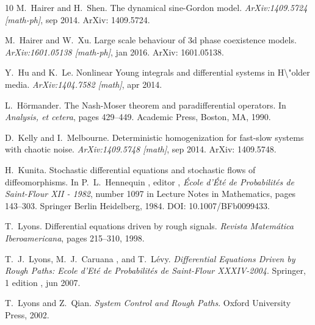 \documentclass[11pt,reqno]{amsart}
\newcommand{\tmtextit}[1]{{\itshape{#1}}}
\begin{document}
\begin{thebibliography}{10}
  M.~Hairer  and  H.~Shen.{\newblock} The
  dynamical sine-Gordon model.{\newblock} \tmtextit{ArXiv:1409.5724
  [math-ph]}, sep 2014.{\newblock} ArXiv: 1409.5724.{\newblock}
  
  M.~Hairer  and  W.~Xu.{\newblock} Large scale
  behaviour of 3d phase coexistence models.{\newblock}
  \tmtextit{ArXiv:1601.05138 [math-ph]}, jan 2016.{\newblock} ArXiv:
  1601.05138.{\newblock}
  
  Y.~Hu  and  K.~Le.{\newblock} Nonlinear Young
  integrals and differential systems in H\textbackslash "older
  media.{\newblock} \tmtextit{ArXiv:1404.7582 [math]}, apr 2014.{\newblock}
  
  L.~H{\"o}rmander.{\newblock} The
  Nash-Moser theorem and paradifferential operators.{\newblock} In
  \tmtextit{Analysis, et cetera},  pages  429--449. Academic Press, Boston,
  MA, 1990.{\newblock}
  
  D.~Kelly  and 
  I.~Melbourne.{\newblock} Deterministic homogenization for fast-slow systems
  with chaotic noise.{\newblock} \tmtextit{ArXiv:1409.5748 [math]}, sep
  2014.{\newblock} ArXiv: 1409.5748.{\newblock}
  
  H.~Kunita.{\newblock} Stochastic
  differential equations and stochastic flows of diffeomorphisms.{\newblock}
  In  P.~L.~Hennequin , editor , \tmtextit{{\'E}cole d'{\'E}t{\'e} de
  Probabilit{\'e}s de Saint-Flour XII - 1982},  number  1097  in  Lecture
  Notes in Mathematics,  pages  143--303. Springer Berlin Heidelberg,
  1984.{\newblock} DOI: 10.1007/BFb0099433.{\newblock}
  
  T.~Lyons.{\newblock} Differential
  equations driven by rough signals.{\newblock} \tmtextit{Revista
  Matem{\'a}tica Iberoamericana},  pages  215--310, 1998.{\newblock}
  
  T.~J.~Lyons, M.~J.~Caruana , and 
  T.~L{\'e}vy.{\newblock} \tmtextit{Differential Equations Driven by Rough
  Paths: Ecole d'Et{\'e} de Probabilit{\'e}s de Saint-Flour
  XXXIV-2004}.{\newblock} Springer, 1  edition , jun 2007.{\newblock}
  
  T.~Lyons  and  Z.~Qian.{\newblock}
  \tmtextit{System Control and Rough Paths}.{\newblock} Oxford University
  Press, 2002.{\newblock}
  

\end{thebibliography}
\end{document}
